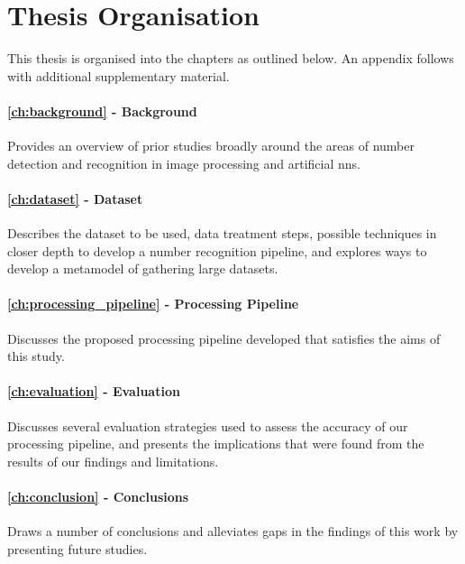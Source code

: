 \section{Thesis Organisation}
\label{sec:introduction:organisation}

This thesis is organised into the chapters as outlined below. An appendix follows with additional supplementary material.

\paragraph{\cref{ch:background} - Background} Provides an overview of prior studies broadly around the areas of number detection and recognition in image processing and artificial \glspl{nn}.

\paragraph{\cref{ch:dataset} - Dataset} Describes the dataset to be used, data treatment steps, possible techniques in closer depth to develop a number recognition pipeline, and explores ways to develop a metamodel of gathering large datasets.

\paragraph{\cref{ch:processing_pipeline} - Processing Pipeline} Discusses the proposed processing pipeline developed that satisfies the aims of this study.

\paragraph{\cref{ch:evaluation} - Evaluation} Discusses several evaluation strategies used to assess the accuracy of our processing pipeline, and presents the implications that were found from the results of our findings and limitations.

\paragraph{\cref{ch:conclusion} - Conclusions} Draws a number of conclusions and alleviates gaps in the findings of this work by presenting future studies.